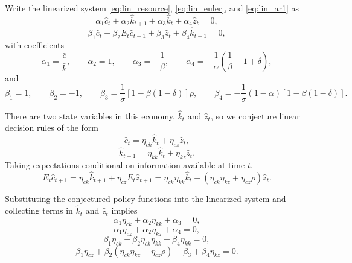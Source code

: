 \documentclass[12pt]{article}
\begin{document}
Write the linearized system \eqref{eq:lin_resource}, \eqref{eq:lin_euler}, and \eqref{eq:lin_ar1} as
\begin{equation*}
\alpha_1 \hat c_t + \alpha_2 \hat k_{t+1} + \alpha_3 \hat k_t + \alpha_4 \hat z_t = 0,
\end{equation*}
\begin{equation*}
\beta_1 \hat c_t + \beta_2 E_t\hat c_{t+1} + \beta_3 \hat z_t + \beta_4 \hat k_{t+1} = 0,
\end{equation*}
with coefficients
\begin{equation*}
\alpha_1 = \frac{\bar c}{\bar k},
\qquad
\alpha_2 = 1,
\qquad
\alpha_3 = -\frac{1}{\beta},
\qquad
\alpha_4 = -\frac{1}{\alpha}\left(\frac{1}{\beta}-1+\delta\right),
\end{equation*}
and
\begin{equation*}
\beta_1 = 1,
\qquad
\beta_2 = -1,
\qquad
\beta_3 = \frac{1}{\sigma}\left[1-\beta(1-\delta)\right]\rho,
\qquad
\beta_4 = -\frac{1}{\sigma}(1-\alpha)\left[1-\beta(1-\delta)\right].
\end{equation*}

There are two state variables in this economy, $\hat k_t$ and $\hat z_t$, so we conjecture linear decision rules of the form
\begin{equation}
\hat c_t = \eta_{ck}\hat k_t + \eta_{cz}\hat z_t,
\label{eq:policy_c}
\end{equation}
\begin{equation}
\hat k_{t+1} = \eta_{kk}\hat k_t + \eta_{kz}\hat z_t.
\label{eq:policy_k}
\end{equation}
Taking expectations conditional on information available at time $t$,
\begin{equation*}
E_t \hat c_{t+1}
= \eta_{ck}\hat k_{t+1} + \eta_{cz}E_t\hat z_{t+1}
= \eta_{ck}\eta_{kk}\hat k_t + \left(\eta_{ck}\eta_{kz}+\eta_{cz}\rho\right)\hat z_t.
\end{equation*}

Substituting the conjectured policy functions into the linearized system and collecting terms in $\hat k_t$ and $\hat z_t$ implies
\begin{equation}
\alpha_1\eta_{ck}+\alpha_2\eta_{kk}+\alpha_3=0,
\label{eq:und1}
\end{equation}
\begin{equation}
\alpha_1\eta_{cz}+\alpha_2\eta_{kz}+\alpha_4=0,
\label{eq:und2}
\end{equation}
\begin{equation}
\beta_1\eta_{ck}+\beta_2\eta_{ck}\eta_{kk}+\beta_4\eta_{kk}=0,
\label{eq:und3}
\end{equation}
\begin{equation}
\beta_1\eta_{cz}
+ \beta_2\left(\eta_{ck}\eta_{kz}+\eta_{cz}\rho\right)
+ \beta_3
+ \beta_4\eta_{kz}=0.
\label{eq:und4}
\end{equation}
\end{document}
